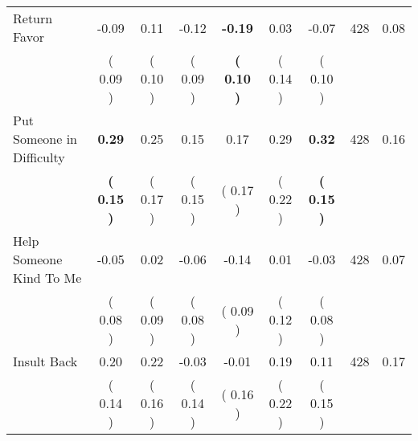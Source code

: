 \begin{tabular}{lcccccccc}
Return Favor &     -0.09 &      0.11 &     -0.12 & \textbf{    -0.19} &      0.03 &     -0.07 & 428 &       0.08 \\ 
 & (     0.09 ) & (     0.10 ) & (     0.09 ) & \textbf{(     0.10 )} & (     0.14 ) & (     0.10 ) & \\
Put Someone in Difficulty & \textbf{     0.29} &      0.25 &      0.15 &      0.17 &      0.29 & \textbf{     0.32} & 428 &       0.16 \\ 
 & \textbf{(     0.15 )} & (     0.17 ) & (     0.15 ) & (     0.17 ) & (     0.22 ) & \textbf{(     0.15 )} & \\
Help Someone Kind To Me &     -0.05 &      0.02 &     -0.06 &     -0.14 &      0.01 &     -0.03 & 428 &       0.07 \\ 
 & (     0.08 ) & (     0.09 ) & (     0.08 ) & (     0.09 ) & (     0.12 ) & (     0.08 ) & \\
Insult Back &      0.20 &      0.22 &     -0.03 &     -0.01 &      0.19 &      0.11 & 428 &       0.17 \\ 
 & (     0.14 ) & (     0.16 ) & (     0.14 ) & (     0.16 ) & (     0.22 ) & (     0.15 ) & \\
\bottomrule
\end{tabular}
